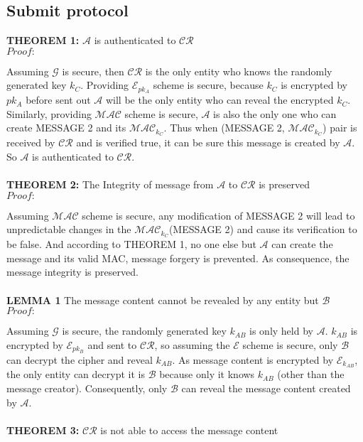 \subsection{Submit protocol}
\textbf{THEOREM 1:} $\mathcal{A}$ is authenticated to $\mathcal{CR}$ \\
\emph{$Proof:$} \par
Assuming $\mathcal{G}$ is secure, then $\mathcal{CR}$ is the only entity who knows the randomly generated key $k_C$. Providing $\mathcal{E}_{pk_A}$ scheme is secure, because $k_C$ is encrypted by $pk_A$ before sent out $\mathcal{A}$ will be the only entity who can reveal the encrypted $k_C$. Similarly, providing $\mathcal{MAC}$ scheme is secure, $\mathcal{A}$ is also the only one who can create MESSAGE 2 and its $\mathcal{MAC}_{k_C}$. Thus when (MESSAGE 2, $\mathcal{MAC}_{k_C}$) pair is received by $\mathcal{CR}$ and is verified true, it can be sure this message is created by $\mathcal{A}$. So $\mathcal{A}$ is authenticated to $\mathcal{CR}$.
\\
\\
\textbf{THEOREM 2:} The Integrity of message from $\mathcal{A}$ to $\mathcal{CR}$ is preserved \\
\emph{$Proof:$} \par
Assuming $\mathcal{MAC}$ scheme is secure, any modification of MESSAGE 2 will lead to unpredictable changes in the $\mathcal{MAC}_{k_C}$(MESSAGE 2) and cause its verification to be false. And according to THEOREM 1, no one else but $\mathcal{A}$ can create the message and its valid MAC, message forgery is prevented. As consequence, the message integrity is preserved.
\\
\\
\textbf{LEMMA 1} The message content cannot be revealed by any entity but $\mathcal{B}$ \\
\emph{$Proof:$} \par
Assuming $\mathcal{G}$ is secure, the randomly generated key $k_{AB}$ is only held by $\mathcal{A}$. $k_{AB}$ is encrypted by $\mathcal{E}_{pk_B}$ and sent to $\mathcal{CR}$, so assuming the $\mathcal{E}$ scheme is secure, only $\mathcal{B}$ can decrypt the cipher and reveal $k_{AB}$. As message content is encrypted by $\mathcal{E}_{k_{AB}}$, the only entity can decrypt it is $\mathcal{B}$ because only it knows $k_{AB}$ (other than the message creator). Consequently, only $\mathcal{B}$ can reveal the message content created by $\mathcal{A}$.
\\
\\
\textbf{THEOREM 3:} $\mathcal{CR}$ is not able to access the message content
